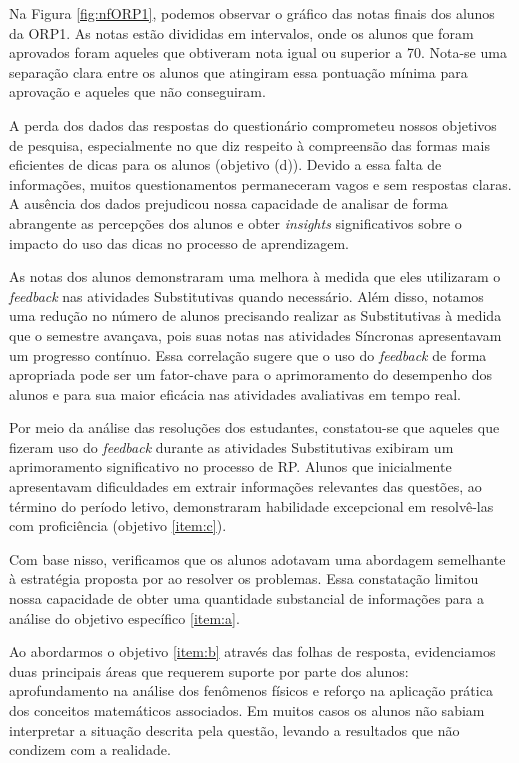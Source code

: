 Na Figura \ref{fig:nfORP1}, podemos observar o gráfico das notas finais dos alunos da ORP1. As notas estão divididas em intervalos, onde os alunos que foram aprovados foram aqueles que obtiveram nota igual ou superior a 70. Nota-se uma separação clara entre os alunos que atingiram essa pontuação mínima para aprovação e aqueles que não conseguiram.

A perda dos dados das respostas do questionário comprometeu nossos objetivos de pesquisa, especialmente no que diz respeito à compreensão das formas mais eficientes de dicas para os alunos (objetivo (d)). Devido a essa falta de informações, muitos questionamentos permaneceram vagos e sem respostas claras. A ausência dos dados prejudicou nossa capacidade de analisar de forma abrangente as percepções dos alunos e obter \textit{insights} significativos sobre o impacto do uso das dicas no processo de aprendizagem.

As notas dos alunos demonstraram uma melhora à medida que eles utilizaram o \textit{feedback} nas atividades Substitutivas quando necessário. Além disso, notamos uma redução no número de alunos precisando realizar as Substitutivas à medida que o semestre avançava, pois suas notas nas atividades Síncronas apresentavam um progresso contínuo. Essa correlação sugere que o uso do \textit{feedback} de forma apropriada pode ser um fator-chave para o aprimoramento do desempenho dos alunos e para sua maior eficácia nas atividades avaliativas em tempo real.

Por meio da análise das resoluções dos estudantes, constatou-se que aqueles que fizeram uso do \textit{feedback} durante as atividades Substitutivas exibiram um aprimoramento significativo no processo de RP. Alunos que inicialmente apresentavam dificuldades em extrair informações relevantes das questões, ao término do período letivo, demonstraram habilidade excepcional em resolvê-las com proficiência (objetivo \ref{item:c}).

Com base nisso, verificamos que os alunos adotavam uma abordagem semelhante à estratégia proposta por  ao resolver os problemas. Essa constatação limitou nossa capacidade de obter uma quantidade substancial de informações para a análise do objetivo específico \ref{item:a}.

Ao abordarmos o objetivo \ref{item:b} através das folhas de resposta, evidenciamos duas principais áreas que requerem suporte por parte dos alunos: aprofundamento na análise dos fenômenos físicos e reforço na aplicação prática dos conceitos matemáticos associados. Em muitos casos os alunos não sabiam interpretar a situação descrita pela questão, levando a resultados que não condizem com a realidade.

